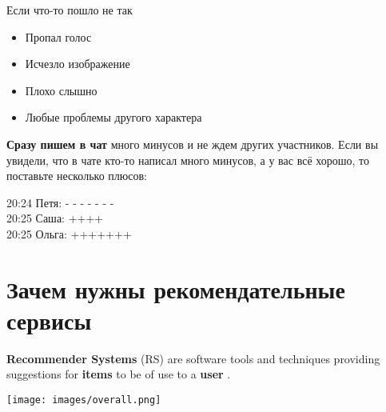 \documentclass[11pt,aspectratio=169,handout]{beamer}
\begin{document}
\begin{frame}{Если что-то пошло не так}

\begin{itemize}
\item Пропал голос
\item Исчезло изображение
\item Плохо слышно
\item Любые проблемы другого характера
\end{itemize}
\vfill
{\bf Сразу пишем в чат} много минусов и не ждем других участников. Если вы увидели, что в чате кто-то написал много минусов, а у вас всё хорошо, то поставьте несколько плюсов:
\vfill
\begin{tcolorbox}[colback=gray!5,colframe=gray!80,title=]
20:24 Петя: - - - - - - -  \\
20:25 Саша: ++++ \\
20:25 Ольга: +++++++
\end{tcolorbox}

\end{frame}

\section{Зачем нужны рекомендательные сервисы}

\begin{frame}{}

\vfill
\begin{tcolorbox}[colback=info!5,colframe=info!80,title=]
{\bf Recommender Systems} (RS) are software tools and techniques providing suggestions for {\bf items} to be of use to a {\bf user} \cite{RSHB}.
\end{tcolorbox}
\vfill
\begin{center}
\texttt{[image: images/overall.png]}
\end{center}

\end{frame}

{
\begin{frame}[plain]
\end{frame}
}

{
\begin{frame}[plain]
\end{frame}
}

{
\begin{frame}[plain]
\end{frame}
}
\end{document}
